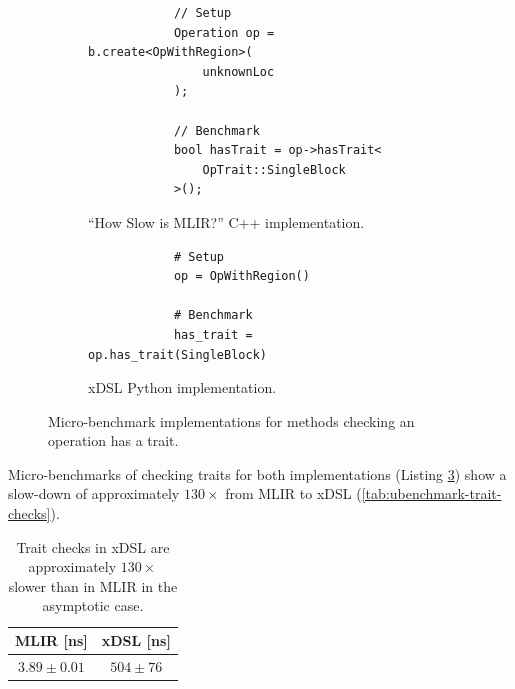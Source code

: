 \begin{figure}[H]
    \centering
    \begin{subfigure}[b]{0.45\textwidth}
       \centering
        \begin{verbatim}
            // Setup
            Operation op = b.create<OpWithRegion>(
                unknownLoc
            );

            // Benchmark
            bool hasTrait = op->hasTrait<
                OpTrait::SingleBlock
            >();
        \end{verbatim}
        \caption{``How Slow is MLIR?'' C++ implementation.}
        \label{listing:ubenchmark-trait-checks-bench-mlir}
    \end{subfigure}
    \hfill
    \begin{subfigure}[b]{0.45\textwidth}
        \centering
        \begin{verbatim}
            # Setup
            op = OpWithRegion()

            # Benchmark
            has_trait = op.has_trait(SingleBlock)
        \end{verbatim}
        \footnotesize\vspace{2em}
        \caption{xDSL Python implementation.}
        \label{listing:ubenchmark-trait-checks-bench-xdsl}
    \end{subfigure}
    \vspace{1em}
    \captionsetup{name=Listing}
    \caption{Micro-benchmark implementations for methods checking an operation has a trait.}
    \label{listing:ubenchmark-trait-checks-bench}
\end{figure}

Micro-benchmarks of checking traits for both implementations (Listing \ref{listing:ubenchmark-trait-checks-bench}) show a slow-down of approximately $130\times$ from MLIR to xDSL (\autoref{tab:ubenchmark-trait-checks}).

\begin{table}[H]
  \caption{Trait checks in xDSL are approximately $130\times$ slower than in MLIR in the asymptotic case.} %
  \label{tab:ubenchmark-trait-checks}
  \centering
  \begin{tabular}{cc}
    \toprule
    \textbf{MLIR [ns]} & \textbf{xDSL [ns]}\\
    \midrule
    $3.89 \pm 0.01$ & $504 \pm 76$ \\
    \bottomrule
  \end{tabular}
\end{table}


